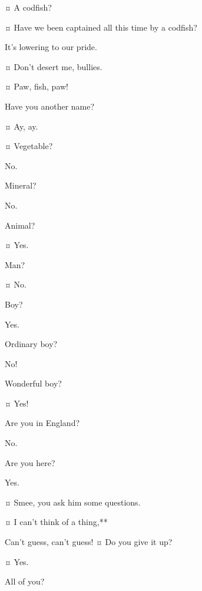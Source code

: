 \begin{drama}
\hookspeaks {}¤
A codfish?

\smeespeaks {}¤
Have we been captained all this time by a codfish?

\starkeyspeaks
It’s lowering to our pride.

\hookspeaks {}¤
Don’t desert me, bullies.

\peterspeaks {}¤
Paw, fish, paw!


\hookspeaks
Have you another name?

\peterspeaks {}¤
Ay, ay.

\hookspeaks {}¤
Vegetable?

\peterspeaks
No.

\hookspeaks
Mineral?

\peterspeaks
No.

\hookspeaks
Animal?

\peterspeaks {}¤
Yes.

\hookspeaks
Man?

\peterspeaks {}¤
No.

\hookspeaks
Boy?

\peterspeaks
Yes.

\hookspeaks
Ordinary boy?

\peterspeaks
No!

\hookspeaks
Wonderful boy?

\peterspeaks {}¤
Yes!

\hookspeaks
Are you in England?

\peterspeaks
No.

\hookspeaks
Are you here?

\peterspeaks
Yes.

\hookspeaks {}¤
Smee, you ask him some questions.

\smeespeaks {}¤
I can’t think of a thing,**

\peterspeaks
Can’t guess, can’t guess!
¤
Do you give it up?

\hookspeaks {}¤
Yes.

\peterspeaks
All of you?


\end{drama}
